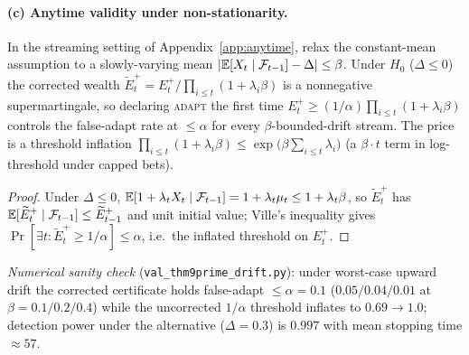 \paragraph{(c) Anytime validity under non-stationarity.}
\begin{proposition}\label{thm:anytime-drift}
In the streaming setting of Appendix~\ref{app:anytime}, relax the constant-mean assumption to a
slowly-varying mean $|\mathbb{E}[X_t\mid\mathcal F_{t-1}]-\Delta|\le\beta$. Under $H_0$ ($\Delta\le0$) the
corrected wealth $\widetilde E_t^{+}=E_t^{+}/\prod_{i\le t}(1+\lambda_i\beta)$ is a nonnegative
supermartingale, so declaring \textsc{adapt} the first time
$E_t^{+}\ge(1/\alpha)\prod_{i\le t}(1+\lambda_i\beta)$ controls the false-adapt rate at $\le\alpha$
for every $\beta$-bounded-drift stream. The price is a threshold inflation
$\prod_{i\le t}(1+\lambda_i\beta)\le\exp\!\bigl(\beta\textstyle\sum_{i\le t}\lambda_i\bigr)$ (a
$\beta\!\cdot\!t$ term in log-threshold under capped bets).
\end{proposition}
\begin{proof}
Under $\Delta\le0$, $\mathbb{E}[1+\lambda_tX_t\mid\mathcal F_{t-1}]=1+\lambda_t\mu_t\le1+\lambda_t\beta$, so
$\widetilde E_t^{+}$ has $\mathbb{E}[\widetilde E_t^{+}\mid\mathcal F_{t-1}]\le\widetilde E_{t-1}^{+}$ and unit
initial value; Ville's inequality gives $\Pr[\exists t:\widetilde E_t^{+}\ge1/\alpha]\le\alpha$,
i.e.\ the inflated threshold on $E_t^{+}$. \qedhere
\end{proof}
\noindent\emph{Numerical sanity check} (\texttt{val\_thm9prime\_drift.py}): under worst-case upward
drift the corrected certificate holds false-adapt $\le\alpha{=}0.1$ ($0.05/0.04/0.01$ at
$\beta=0.1/0.2/0.4$) while the uncorrected $1/\alpha$ threshold inflates to $0.69\!\to\!1.0$;
detection power under the alternative ($\Delta{=}0.3$) is $0.997$ with mean stopping time $\approx57$.
